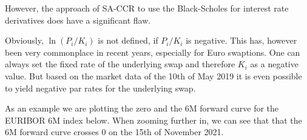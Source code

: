     

    
    However, the approach of SA-CCR to use the Black-Scholes for interest
rate derivatives does have a significant flaw.

Obviously, \(\ln\left(P_i / K_i \right)\) is not defined, if \(P_i/K_i\)
is negative. This has, however been very commonplace in recent years,
especially for Euro swaptions. One can always set the fixed rate of the
underlying swap and therefore \(K_i\) as a negative value. But based on
the market data of the 10th of May 2019 it is even possible to yield
negative par rates for the underlying swap.

As an example we are plotting the zero and the 6M forward curve for the
EURIBOR 6M index below. When zooming further in, we can see that that
the 6M forward curve crosses 0 on the 15th of November 2021.


